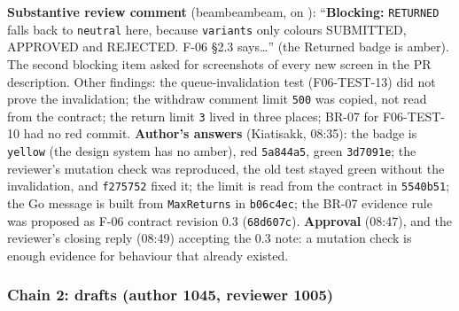 \textbf{Substantive review comment} (beambeambeam, on ): ``\textbf{Blocking:} \texttt{RETURNED} falls back to \texttt{neutral} here, because \texttt{variants} only colours SUBMITTED, APPROVED and REJECTED. F-06 \S2.3 says\ldots'' (the Returned badge is amber). The second blocking item asked for screenshots of every new screen in the PR description. Other findings: the queue-invalidation test (F06-TEST-13) did not prove the invalidation; the withdraw comment limit \texttt{500} was copied, not read from the contract; the return limit \texttt{3} lived in three places; BR-07 for F06-TEST-10 had no red commit.
\textbf{Author's answers} (Kiatisakk, 08:35): the badge is \texttt{yellow} (the design system has no amber), red \texttt{5a844a5}, green \texttt{3d7091e}; the reviewer's mutation check was reproduced, the old test stayed green without the invalidation, and \texttt{f275752} fixed it; the limit is read from the contract in \texttt{5540b51}; the Go message is built from \texttt{MaxReturns} in \texttt{b06c4ec}; the BR-07 evidence rule was proposed as F-06 contract revision 0.3 (\texttt{68d607c}).
\textbf{Approval} (08:47), and the reviewer's closing reply (08:49) accepting the 0.3 note: a mutation check is enough evidence for behaviour that already existed.


\subsubsection*{Chain 2: drafts (author 1045, reviewer 1005)}

